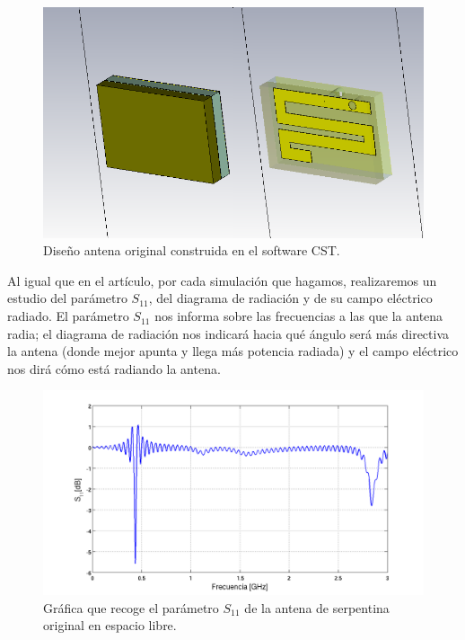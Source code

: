 \begin{figure}[!htb]
    \centering
    \includegraphics[scale=0.45]{./Simulaciones/original_antenna/original_antenna_copy}
    \caption{Diseño antena original construida en el software CST.}
    \label{fig:fig5.2}
\end{figure}

Al igual que en el artículo, por cada simulación que hagamos, realizaremos un estudio del parámetro $S_{11}$, del diagrama de radiación y de su campo eléctrico radiado. El parámetro $S_{11}$ nos informa sobre las frecuencias a las que la antena radia; el diagrama de radiación nos indicará hacia qué ángulo será más directiva la antena (donde mejor apunta y llega más potencia radiada) y el campo eléctrico nos dirá cómo está radiando la antena.

\begin{figure}[!htb]
    \centering
    \includegraphics[scale=0.45]{./Simulaciones/matlab2/S11_original_free}
    \caption{Gráfica que recoge el parámetro $S_{11}$ de la antena de serpentina original en espacio libre.}
    \label{fig:fig5.3}
\end{figure}


